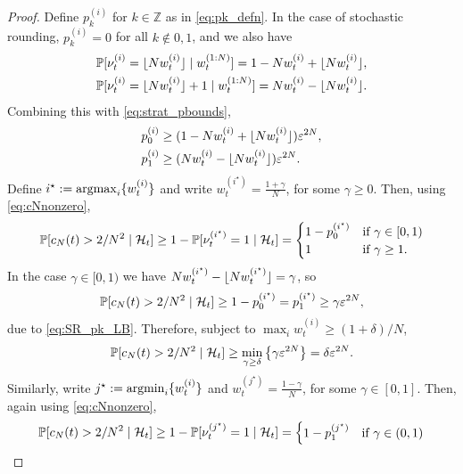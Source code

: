 \begin{proof}
Define $p_k^{(i)}$ for $k\in\mathbb{Z}$ as in \eqref{eq:pk_defn}. In the case of stochastic rounding,
$p_{k}^{(i)} =0$ for all $k\notin {0,1}$, and we also have
\begin{align*}
&\Prob[ \nu_t^{(i)} = \flnw \mid w_t^{(1:N)} ]
= 1- N w_t^{(i)} + \flnw , \\
&\Prob[ \nu_t^{(i)} = \flnw +1 \mid w_t^{(1:N)} ]
= N w_t^{(i)} - \flnw .
\end{align*}
Combining this with \eqref{eq:strat_pbounds},
\begin{align}
p_0^{(i)} 
&\geq ( 1- N w_t^{(i)} + \flnw ) \varepsilon^{2N} , \notag\\
p_1^{(i)} 
&\geq ( N w_t^{(i)} - \flnw ) \varepsilon^{2N} . \label{eq:SR_pk_LB}
\end{align}
Define $i^\star := \argmax_i \{ w_t^{(i)} \}$ and write
$w_t^{(i^\star)} = \frac{1+\gamma}{N}$, for some $\gamma \geq 0$.
Then, using \eqref{eq:cNnonzero}, 
\begin{equation*}
\Prob[ c_N(t) > 2/N^2 \mid \mathcal{H}_t ]
\geq 1- \Prob[ \nu_t^{(i^\star)} =1 \mid \mathcal{H}_t ]
= \begin{cases}
    1 - p_0^{(i^\star)} & \text{if } \gamma \in [0,1) \\
    1 & \text{if } \gamma \geq 1 .
\end{cases}
\end{equation*}
In the case $\gamma \in [0,1)$ we have $N w_t^{(i^\star)} - \flnw[i^\star] = \gamma$, so
\begin{equation*}
\Prob[ c_N(t) > 2/N^2 \mid \mathcal{H}_t ]
\geq 1 - p_0^{(i^\star)}
= p_1^{(i^\star)}
\geq \gamma \varepsilon^{2N} ,
\end{equation*}
due to \eqref{eq:SR_pk_LB}.
Therefore, subject to $\max_i w_t^{(i)} \geq (1+\delta)/N$,
\begin{equation*}
\Prob[ c_N(t) > 2/N^2 \mid \mathcal{H}_t ]
\geq \min_{\gamma \geq \delta} 
        \left\{ \gamma \varepsilon^{2N} \right\}
= \delta \varepsilon^{2N} .
\end{equation*}
Similarly, write $j^\star := \argmin_i \{ w_t^{(i)} \}$ and
$w_t^{(j^\star)} = \frac{1-\gamma}{N}$, for some 
$\gamma \in [0,1]$.
Then, again using \eqref{eq:cNnonzero},
\begin{equation*}
\Prob[ c_N(t) > 2/N^2 \mid \mathcal{H}_t ]
\geq 1- \Prob[ \nu_t^{(j^\star)} =1 \mid \mathcal{H}_t ]
= \begin{cases}
    1 - p_1^{(j^\star)} & \text{if } \gamma \in (0,1) \\

\end{cases}
\end{equation*}
\end{proof}
